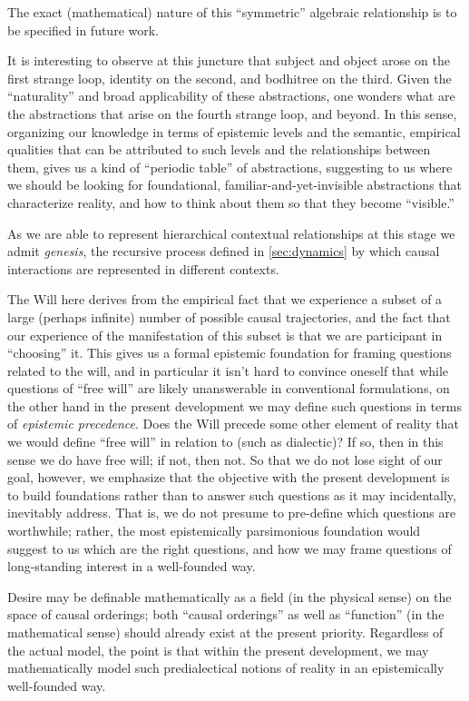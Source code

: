 \documentclass[pra,twocolumn,groupedaddress,10pt]{revtex4}
\theoremstyle{definition}
\begin{document}
\begin{enumerate}[label={[\textbf{\arabic*}]},start=0]
		The exact (mathematical) nature of this ``symmetric'' algebraic relationship is to be specified in future work.

		It is interesting to observe at this juncture that subject and object arose on the first strange loop, identity on the second, and bodhitree on the third. Given the ``naturality'' and broad applicability of these abstractions, one wonders what are the abstractions that arise on the fourth strange loop, and beyond. In this sense, organizing our knowledge in terms of epistemic levels and the semantic, empirical qualities that can be attributed to such levels and the relationships between them, gives us a kind of ``periodic table'' of abstractions, suggesting to us where we should be looking for foundational, familiar-and-yet-invisible abstractions that characterize reality, and how to think about them so that they become ``visible.''

		As we are able to represent hierarchical contextual relationships at this stage we admit \emph{genesis}, the recursive process defined in \autoref{sec:dynamics} by which causal interactions are represented in different contexts.

		The Will here derives from the empirical fact that we experience a subset of a large (perhaps infinite) number of possible causal trajectories, and the fact that our experience of the manifestation of this subset is that we are participant in ``choosing'' it. This gives us a formal epistemic foundation for framing questions related to the will, and in particular it isn't hard to convince oneself that while questions of ``free will'' are likely unanswerable in conventional formulations, on the other hand in the present development we may define such questions in terms of \emph{epistemic precedence}. Does the Will precede some other element of reality that we would define ``free will'' in relation to (such as dialectic)? If so, then in this sense we do have free will; if not, then not. So that we do not lose sight of our goal, however, we emphasize that the objective with the present development is to build foundations rather than to answer such questions as it may incidentally, inevitably address. That is, we do not presume to pre-define which questions are worthwhile; rather, the most epistemically parsimonious foundation would suggest to us which are the right questions, and how we may frame questions of long-standing interest in a well-founded way.

		Desire may be definable mathematically as a field (in the physical sense) on the space of causal orderings; both ``causal orderings'' as well as ``function'' (in the mathematical sense) should already exist at the present priority. Regardless of the actual model, the point is that within the present development, we may mathematically model such predialectical notions of reality in an epistemically well-founded way.


\end{enumerate}
\end{document}
